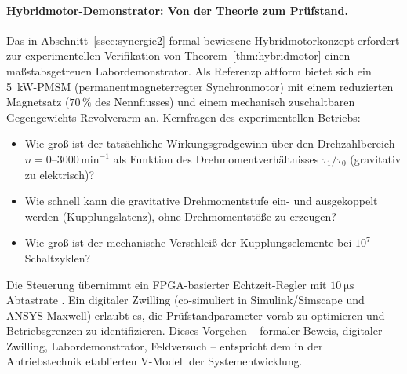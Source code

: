 ﻿\documentclass[12pt, a4paper]{report}
\theoremstyle{definition}
\theoremstyle{remark}
\begin{document}
\paragraph{Hybridmotor-Demonstrator: Von der Theorie zum Prüfstand.}
Das in Abschnitt~\ref{ssec:synergie2} formal bewiesene Hybridmotorkonzept
erfordert zur experimentellen Verifikation von Theorem~\ref{thm:hybridmotor}
einen maßstabsgetreuen Labordemonstrator. Als Referenzplattform bietet sich ein
\SI{5}{\kilo\watt}-PMSM (permanentmagneterregter Synchronmotor) mit einem
reduzierten Magnetsatz ($70\,\%$ des Nennflusses) und einem mechanisch
zuschaltbaren Gegengewichts-Revolverarm an. Kernfragen des experimentellen
Betriebs:
\begin{itemize}
  \item Wie groß ist der tatsächliche Wirkungsgradgewinn über den Drehzahlbereich
        $n = 0$--$3000\,\text{min}^{-1}$ als Funktion des Drehmomentverhältnisses
        $\tau_1 / \tau_0$ (gravitativ zu elektrisch)?
  \item Wie schnell kann die gravitative Drehmomentstufe ein- und ausgekoppelt
        werden (Kupplungslatenz), ohne Drehmomentstöße zu erzeugen?
  \item Wie groß ist der mechanische Verschleiß der Kupplungselemente bei
        $10^7$ Schaltzyklen?
\end{itemize}
Die Steuerung übernimmt ein FPGA-basierter Echtzeit-Regler mit
$\SI{10}{\micro\second}$ Abtastrate \cite{bose2002}. Ein digitaler Zwilling
(co-simuliert in Simulink/Simscape und ANSYS Maxwell) erlaubt es, die
Prüfstandparameter vorab zu optimieren und Betriebsgrenzen zu identifizieren.
Dieses Vorgehen -- formaler Beweis, digitaler Zwilling, Labordemonstrator,
Feldversuch -- entspricht dem in der Antriebstechnik etablierten
V-Modell der Systementwicklung.
\end{document}
